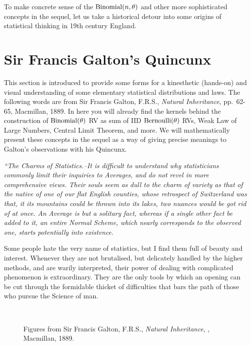 To make concrete sense of the $\mbox{{\rm Binomial}}(n,\theta)$ and other more sophisticated concepts in the sequel, let us take a historical detour into some origins of statistical thinking in 19th century England.

\section{Sir Francis Galton's Quincunx}\label{S:Quincunx}
This section is introduced to provide some forms for a kinesthetic (hands-on) and visual understanding of some elementary statistical distributions and laws.  The following words are from Sir Francis Galton, F.R.S., {\em Natural Inheritance}, pp.~62-65, Macmillan, 1889.  In here you will already find the kernels behind the construction of $\mbox{{\rm Binomial}}(\theta)$ RV as sum of IID $\mbox{{\rm Bernoulli}}(\theta)$ RVs, Weak Law of Large Numbers, Central Limit Theorem, and more.  We will mathematically present these concepts in the sequel as a way of giving precise meanings to Galton's observations with his Quincunx.
{\it ``{\em The Charms of Statistics}.--It is difficult to understand why statisticians commonly limit their inquiries to Averages, and do not revel in more comprehensive views.  Their souls seem as dull to the charm of variety as that of the native of one of our flat English counties, whose retrospect of Switzerland was that, it its mountains could be thrown into its lakes, two nuances would be got rid of at once.  An Average is but a solitary fact, whereas if a single other fact be added to it, an entire Normal Scheme, which nearly corresponds to the observed one, starts potentially into existence.

Some people hate the very name of statistics, but I find them full of beauty and interest.  Whenever they are not brutalised, but delicately handled by the higher methods, and are warily interpreted, their power of dealing with complicated phenomenon is extraordinary.  They are the only tools by which an opening can be cut through the formidable thicket of difficulties that bars the path of those who pursue the Science of man.}

\begin{figure}[htpb]
\caption{Figures from Sir Francis Galton, F.R.S., {\em Natural Inheritance}, , Macmillan, 1889.\label{F:GaltonFigure78923}}
\mbox{ \hspace{-0.5cm}  }
\end{figure}

